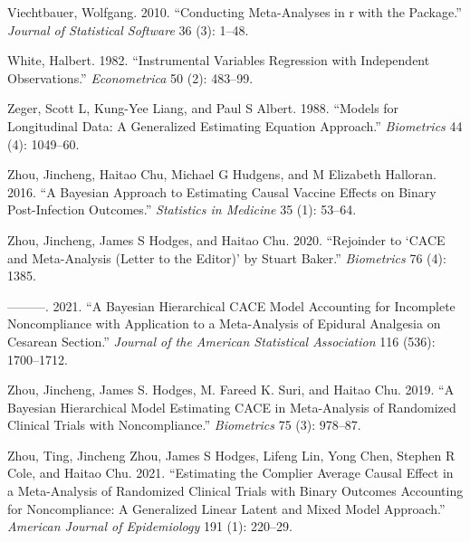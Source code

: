 \begin{CSLReferences}{1}{0}
\leavevmode{}%
Viechtbauer, Wolfgang. 2010. {``Conducting Meta-Analyses in {r} with the  Package.''} \emph{Journal of Statistical Software} 36 (3): 1--48.

\leavevmode{}%
White, Halbert. 1982. {``Instrumental Variables Regression with Independent Observations.''} \emph{Econometrica} 50 (2): 483--99.

\leavevmode{}%
Zeger, Scott L, Kung-Yee Liang, and Paul S Albert. 1988. {``Models for Longitudinal Data: A Generalized Estimating Equation Approach.''} \emph{Biometrics} 44 (4): 1049--60.

\leavevmode{}%
Zhou, Jincheng, Haitao Chu, Michael G Hudgens, and M Elizabeth Halloran. 2016. {``A Bayesian Approach to Estimating Causal Vaccine Effects on Binary Post-Infection Outcomes.''} \emph{Statistics in Medicine} 35 (1): 53--64.

\leavevmode{}%
Zhou, Jincheng, James S Hodges, and Haitao Chu. 2020. {``Rejoinder to `CACE and Meta-Analysis (Letter to the Editor)' by Stuart Baker.''} \emph{Biometrics} 76 (4): 1385.

\leavevmode{}%
---------. 2021. {``A Bayesian Hierarchical CACE Model Accounting for Incomplete Noncompliance with Application to a Meta-Analysis of Epidural Analgesia on Cesarean Section.''} \emph{Journal of the American Statistical Association} 116 (536): 1700--1712.

\leavevmode{}%
Zhou, Jincheng, James S. Hodges, M. Fareed K. Suri, and Haitao Chu. 2019. {``A Bayesian Hierarchical Model Estimating CACE in Meta-Analysis of Randomized Clinical Trials with Noncompliance.''} \emph{Biometrics} 75 (3): 978--87.

\leavevmode{}%
Zhou, Ting, Jincheng Zhou, James S Hodges, Lifeng Lin, Yong Chen, Stephen R Cole, and Haitao Chu. 2021. {``Estimating the Complier Average Causal Effect in a Meta-Analysis of Randomized Clinical Trials with Binary Outcomes Accounting for Noncompliance: A Generalized Linear Latent and Mixed Model Approach.''} \emph{American Journal of Epidemiology} 191 (1): 220--29.

\end{CSLReferences}

